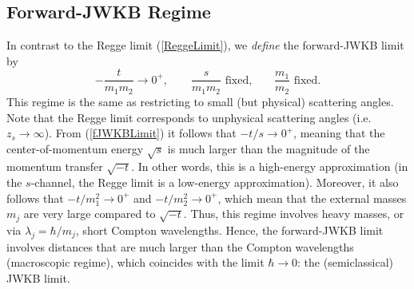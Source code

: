 \subsection{Forward-JWKB Regime}
In contrast to the Regge limit (\ref{ReggeLimit}), we \textit{define} the forward-JWKB limit by
\begin{equation}
	{-\frac{t}{m_{1} m_{2}}} \rightarrow 0^{+}, \qquad \frac{s}{m_{1} m_{2}} \text{ fixed,} \qquad \frac{m_{1}}{m_{2}} \text{ fixed.} \label{fJWKBLimit}
\end{equation}
This regime is the same as restricting to small (but physical) scattering angles. Note that the Regge limit corresponds to unphysical scattering angles (i.e. $z_{s} \rightarrow \infty$). From (\ref{fJWKBLimit}) it follows that $-t/s \rightarrow 0^{+}$, meaning that the center-of-momentum energy $\sqrt{s}$ is much larger than the magnitude of the momentum transfer $\sqrt{-t}$. In other words, this is a high-energy approximation (in the $s$-channel, the Regge limit is a low-energy approximation). Moreover, it also follows that $-t/m_{1}^{2} \rightarrow 0^{+}$ and $-t/m_{2}^{2} \rightarrow 0^{+}$, which mean that the external masses $m_{j}$ are very large compared to $\sqrt{-t}$. Thus, this regime involves heavy masses, or via $\lambda_{j} = \hbar / m_{j}$, short Compton wavelengths. Hence, the forward-JWKB limit involves distances that are much larger than the Compton wavelengths (macroscopic regime), which coincides with the limit $\hbar \rightarrow 0$: the (semiclassical) JWKB limit.

